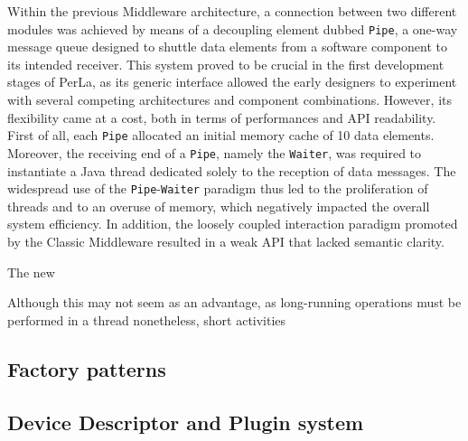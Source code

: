 Within the previous Middleware architecture, a connection between two different
modules was achieved by means of a decoupling element dubbed \texttt{Pipe}, a
one-way message queue designed to shuttle data elements from a software
component to its intended receiver. This system proved to be crucial in the
first development stages of PerLa, as its generic interface allowed the early
designers to experiment with several competing architectures and component
combinations. However, its flexibility came at a cost, both in terms of
performances and API readability. First of all, each \texttt{Pipe} allocated an
initial memory cache of 10 data elements. Moreover, the receiving end of a
\texttt{Pipe}, namely the \texttt{Waiter}, was required to instantiate a Java
thread dedicated solely to the reception of data messages. The widespread use
of the \texttt{Pipe}-\texttt{Waiter} paradigm thus led to the proliferation of
threads and to an overuse of memory, which negatively impacted the overall
system efficiency. In addition, the loosely coupled interaction paradigm
promoted by the Classic Middleware resulted in a weak API that lacked semantic
clarity.

The new 

Although this may not seem as an advantage, as long-running operations must be
performed in a thread nonetheless, short activities



\subsection{Factory patterns}
\label{sec:newmiddleware.factory}

\subsection{Device Descriptor and Plugin system}
\label{sec:newmiddleware.descriptor}
